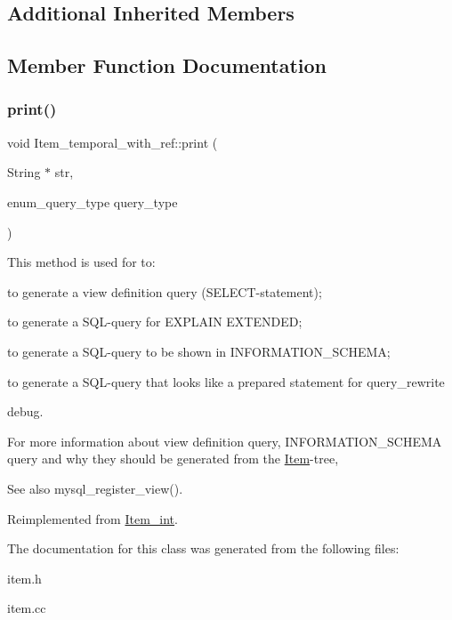 \subsection*{Additional Inherited Members}


\subsection{Member Function Documentation}
\mbox{\label{classItem__temporal__with__ref_ab32f4567ebd0183a399f1a0b8c66e2e8}} 
\subsubsection{\texorpdfstring{print()}{print()}}
{\footnotesize\ttfamily void Item\+\_\+temporal\+\_\+with\+\_\+ref\+::print (\begin{DoxyParamCaption}\item[{String $\ast$}]{str,  }\item[{enum\+\_\+query\+\_\+type}]{query\+\_\+type }\end{DoxyParamCaption})\hspace{0.3cm}{\ttfamily [virtual]}}

This method is used for to\+:
\begin{DoxyItemize}
\item to generate a view definition query (S\+E\+L\+E\+CT-\/statement);
\item to generate a S\+QL-\/query for E\+X\+P\+L\+A\+IN E\+X\+T\+E\+N\+D\+ED;
\item to generate a S\+QL-\/query to be shown in I\+N\+F\+O\+R\+M\+A\+T\+I\+O\+N\+\_\+\+S\+C\+H\+E\+MA;
\item to generate a S\+QL-\/query that looks like a prepared statement for query\+\_\+rewrite
\item debug.
\end{DoxyItemize}

For more information about view definition query, I\+N\+F\+O\+R\+M\+A\+T\+I\+O\+N\+\_\+\+S\+C\+H\+E\+MA query and why they should be generated from the \mbox{\hyperlink{classItem}{Item}}-\/tree, \begin{DoxySeeAlso}{See also}
mysql\+\_\+register\+\_\+view(). 
\end{DoxySeeAlso}


Reimplemented from \mbox{\hyperlink{classItem__int_a7c2f1ba97b34b9b3379d49e85d81bdc0}{Item\+\_\+int}}.



The documentation for this class was generated from the following files\+:\begin{DoxyCompactItemize}
\item 
item.\+h\item 
item.\+cc\end{DoxyCompactItemize}
